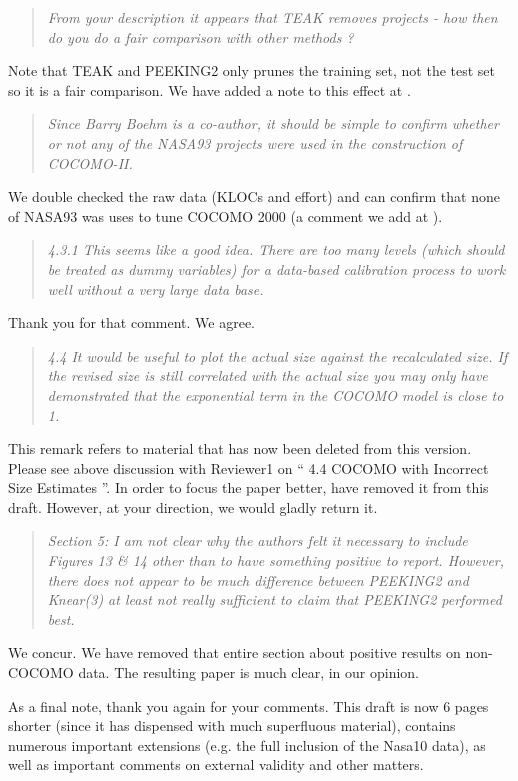 \begin{quote}{\em From your description it appears that TEAK
  removes projects - how then do you do a fair
  comparison with other methods ? }\end{quote}

\noindent Note that TEAK and PEEKING2 only prunes the training set, not the test set so it is a fair comparison.
We have added a note to this effect at .

\begin{quote}{\em Since Barry Boehm is a co-author, it should be simple to confirm whether or not any of the NASA93 projects were used in the construction of COCOMO-II.}\end{quote}

\noindent We double checked the raw data (KLOCs and effort)
and can confirm that none of NASA93 was uses
to tune COCOMO 2000 (a comment we add at 
).


\begin{quote}{\em  4.3.1 This seems like a good idea. There are too many levels (which should be treated as dummy variables) for a data-based calibration process to work well without a very large data base.}\end{quote}

\noindent
Thank you for that comment. We agree.

\begin{quote}{\em 4.4 It would be useful to plot the actual size against the recalculated size. If the revised size is still correlated with the actual size you may only have demonstrated that the exponential term in the COCOMO model is close to 1.}\end{quote}

\noindent
This remark refers to material that has now been deleted from this version.
Please see above discussion with Reviewer1 on `` 4.4 COCOMO with Incorrect Size Estimates ''.
In order to focus the paper better,  have removed it from this draft. However, at your direction, we would gladly return it.


\begin{quote}{\em Section 5: I am not clear why the authors felt it necessary to include Figures 13 \& 14 other than to have something positive to report. However, there does not appear to be much difference between PEEKING2 and Knear(3) at least not really sufficient to claim that PEEKING2 performed best.}\end{quote}

\noindent We concur. We have removed that entire section about positive results on non-COCOMO data.
The resulting paper is much clear, in our opinion.

As a final note, thank you again for your comments. This draft is now 6 pages shorter (since it has dispensed
with much superfluous material), contains numerous important extensions (e.g. the full inclusion of the Nasa10 data),
as well as important comments on external validity and other matters.
\newpage